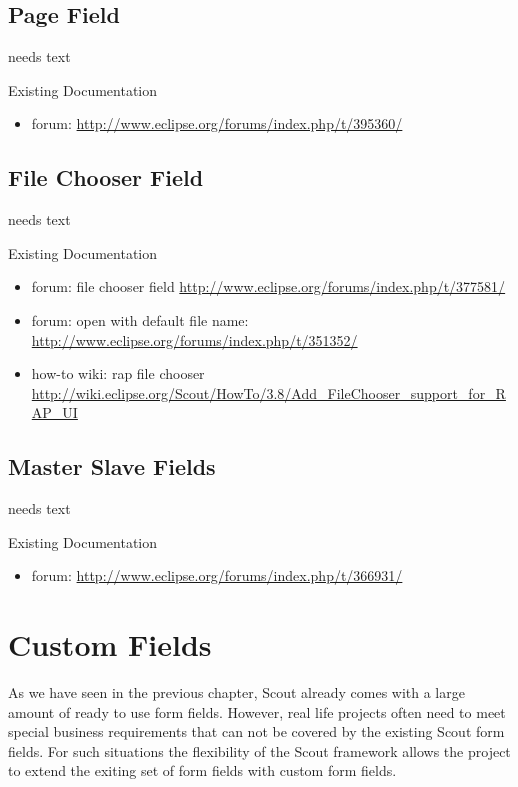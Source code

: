 \documentclass[a4paper,10pt,twoside]{book}
\begin{document}
{%
\section{Page Field}
needs text

\noindent Existing Documentation
\begin{itemize}
  \item forum: \url{http://www.eclipse.org/forums/index.php/t/395360/}
\end{itemize}

\section{File Chooser Field}
needs text

\noindent Existing Documentation
\begin{itemize}
  \item forum: file chooser field \url{http://www.eclipse.org/forums/index.php/t/377581/}
  \item forum: open with default file name: \url{http://www.eclipse.org/forums/index.php/t/351352/}
  \item how-to wiki: rap file chooser \url {http://wiki.eclipse.org/Scout/HowTo/3.8/Add_FileChooser_support_for_RAP_UI}
\end{itemize}

\section{Master Slave Fields}
needs text

\noindent Existing Documentation
\begin{itemize}
  \item forum: \url{http://www.eclipse.org/forums/index.php/t/366931/}
\end{itemize}

\chapter{Custom Fields}

As we have seen in the previous chapter, Scout already comes with a large amount of ready to use form fields. 
However, real life projects often need to meet special business requirements that can not be covered by the existing Scout form fields. 
For such situations the flexibility of the Scout framework allows the project to extend the exiting set of form fields with custom form fields. 

}
\end{document}
